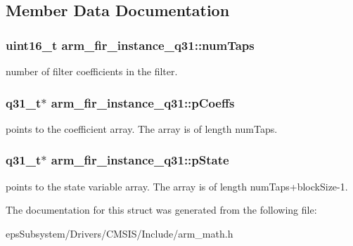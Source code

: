 \subsection{Member Data Documentation}
\hypertarget{structarm__fir__instance__q31_a918fadd775b7a0482b21bf34dae2f094}{
\subsubsection[{num\-Taps}]{\setlength{\rightskip}{0pt plus 5cm}uint16\-\_\-t arm\-\_\-fir\-\_\-instance\-\_\-q31\-::num\-Taps}}\label{structarm__fir__instance__q31_a918fadd775b7a0482b21bf34dae2f094}
number of filter coefficients in the filter. \hypertarget{structarm__fir__instance__q31_afaae4c884bdf11a4ec2f3b9bb2bb51d0}{
\subsubsection[{p\-Coeffs}]{\setlength{\rightskip}{0pt plus 5cm}q31\-\_\-t$\ast$ arm\-\_\-fir\-\_\-instance\-\_\-q31\-::p\-Coeffs}}\label{structarm__fir__instance__q31_afaae4c884bdf11a4ec2f3b9bb2bb51d0}
points to the coefficient array. The array is of length num\-Taps. \hypertarget{structarm__fir__instance__q31_a409f39c93b744784648bdc365541444d}{
\subsubsection[{p\-State}]{\setlength{\rightskip}{0pt plus 5cm}q31\-\_\-t$\ast$ arm\-\_\-fir\-\_\-instance\-\_\-q31\-::p\-State}}\label{structarm__fir__instance__q31_a409f39c93b744784648bdc365541444d}
points to the state variable array. The array is of length num\-Taps+block\-Size-\/1. 

The documentation for this struct was generated from the following file\-:\begin{DoxyCompactItemize}
\item 
eps\-Subsystem/\-Drivers/\-C\-M\-S\-I\-S/\-Include/arm\-\_\-math.\-h\end{DoxyCompactItemize}
